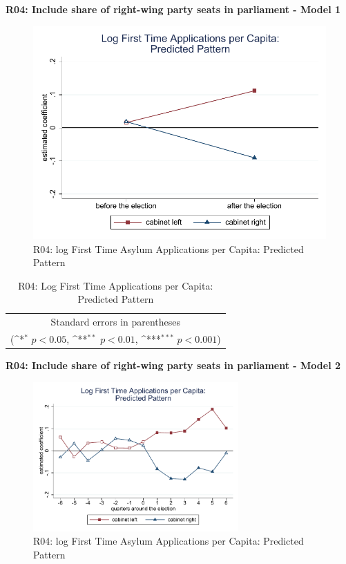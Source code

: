\documentclass[10pt,a4paper]{scrartcl}
\begin{document}
\clearpage
\textbf{R04: Include share of right-wing party seats in parliament - Model 1}
\begin{figure}[!ht]
	\centering
	\includegraphics[width=1\textwidth]{figures_edited/app_graph1_R04.pdf}
	\caption{R04: log First Time Asylum Applications per Capita: Predicted Pattern}
\end{figure}

\begin{table}[!ht]\centering
	\renewcommand{\arraystretch}{1.25}
	\def\sym#1{\ifmmode^{#1}\else\(^{#1}\)\fi}
	\caption{R04: Log First Time Applications per Capita: Predicted Pattern}
	\begin{tabular}{l*{2}{c}}
		\hline\hline
		
		\hline\hline
		\multicolumn{3}{c}{\footnotesize Standard errors in parentheses} \\
		\multicolumn{3}{c}{\footnotesize (\sym{*} \(p<0.05\), \sym{**} \(p<0.01\), \sym{***} \(p<0.001\))}\\
	\end{tabular}
\end{table}

\clearpage
\textbf{R04: Include share of right-wing party seats in parliament - Model 2}
\begin{figure}[!ht]
	\centering
	\includegraphics[width=0.7\textwidth]{figures_edited/app_graph2_R04.pdf}
	\caption{R04: log First Time Asylum Applications per Capita: Predicted Pattern}
\end{figure}
\end{document}
